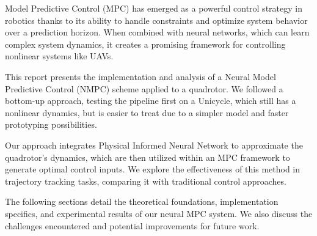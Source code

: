 Model Predictive Control (MPC) has emerged as a powerful control strategy
in robotics thanks to its ability to handle constraints and optimize system
behavior over a prediction horizon. When combined with neural networks,
which can learn complex system dynamics, it creates a promising framework
for controlling nonlinear systems like UAVs.

This report presents the implementation and analysis of a Neural Model
Predictive Control (NMPC) scheme applied to a quadrotor. 
We followed a bottom-up approach, testing the pipeline first on a Unicycle, 
which still has a nonlinear dynamics, but is easier to treat due to a simpler model and faster
prototyping possibilities.

Our approach integrates Physical Informed Neural Network to approximate the
quadrotor's dynamics, which are then utilized within an MPC framework to
generate optimal control inputs. We explore the effectiveness of this
method in trajectory tracking tasks, comparing it with traditional control
approaches.

The following sections detail the theoretical foundations, implementation
specifics, and experimental results of our neural MPC system. We also
discuss the challenges encountered and potential improvements for future
work.